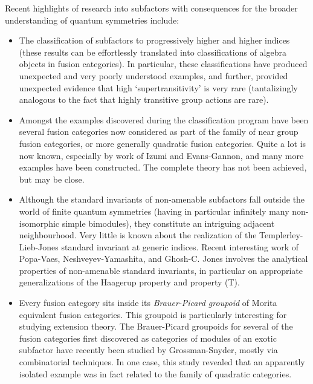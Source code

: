 \documentclass[12pt]{article}
\begin{document}
Recent highlights of research into subfactors with consequences for the broader understanding of quantum symmetries include:
\begin{itemize}
  \setlength{\itemsep}{1pt}
  \setlength{\parskip}{0pt}
  \setlength{\parsep}{0pt}
\item The classification of subfactors to progressively higher and higher indices (these results can be effortlessly translated into classifications of algebra objects in fusion categories). In particular, these classifications have produced unexpected and very poorly understood examples, and further, provided unexpected evidence that high `supertransitivity' is very rare (tantalizingly analogous to the fact that highly transitive group actions are rare).
\item Amongst the examples discovered during the classification program have been several fusion categories now considered as part of the family of near group fusion categories, or more generally quadratic fusion categories. Quite a lot is now known, especially by work of Izumi and Evans-Gannon, and many more examples have been constructed. The complete theory has not been achieved, but may be close.
\item Although the standard invariants of non-amenable subfactors fall outside the world of finite quantum symmetries (having in particular infinitely many non-isomorphic simple bimodules), they constitute an intriguing adjacent neighbourhood. Very little is known about the realization of the Templerley-Lieb-Jones standard invariant at generic indices. Recent interesting work of Popa-Vaes, Neshveyev-Yamashita, and Ghosh-C. Jones involves the analytical properties of non-amenable standard invariants, in particular on appropriate generalizations of the Haagerup property and property (T). 
\item Every fusion category sits inside its \emph{Brauer-Picard groupoid} of Morita equivalent fusion categories. This groupoid is particularly interesting for studying extension theory. The Brauer-Picard groupoids for several of the fusion categories first discovered as categories of modules of an exotic subfactor have recently been studied by Grossman-Snyder, mostly via combinatorial techniques. In one case, this study revealed that an apparently isolated example was in fact related to the family of quadratic categories.
\end{itemize}
\end{document}
